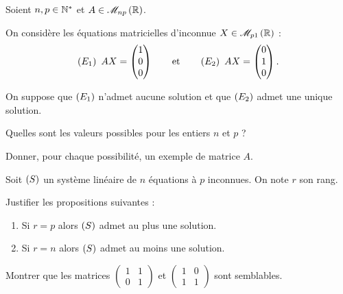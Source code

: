 \begin{corr}
\end{corr}

\begin{exo}[Exercice 4]
Soient \(n,p\in\mathbb{N}^*\) et \(A\in\M{np}[\R]\).

On considère les équations matricielles d'inconnue \(X\in\M{p1}[\R]\) : \[\left(E_1\right)~AX=\begin{pmatrix}1\\0\\0\end{pmatrix}\qquad\text{et}\qquad\left(E_2\right)~AX=\begin{pmatrix}0\\1\\0\end{pmatrix}.\]

On suppose que \(\left(E_1\right)\) n'admet aucune solution et que \(\left(E_2\right)\) admet une unique solution.

Quelles sont les valeurs possibles pour les entiers \(n\) et \(p\) ?

Donner, pour chaque possibilité, un exemple de matrice \(A\).
\end{exo}

\begin{corr}
\end{corr}

\begin{exo}[Exercice 5]
Soit \(\left(S\right)\) un système linéaire de \(n\) équations à \(p\) inconnues. On note \(r\) son rang.

Justifier les propositions suivantes :

\begin{enumerate}
\item Si \(r=p\) alors \(\left(S\right)\) admet au plus une solution. \\

\item Si \(r=n\) alors \(\left(S\right)\) admet au moins une solution.
\end{enumerate}
\end{exo}

\begin{corr}
\end{corr}

\begin{exo}[Exercice 6]
Montrer que les matrices \(\begin{pmatrix}
1 & 1 \\
0 & 1
\end{pmatrix}\) et \(\begin{pmatrix}
1 & 0 \\
1 & 1
\end{pmatrix}\) sont semblables.
\end{exo}

